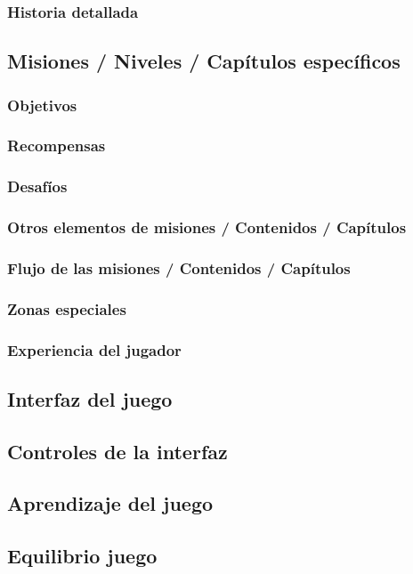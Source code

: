 \subsubsection{Historia detallada}
\subsection{Misiones / Niveles / Capítulos específicos}
\subsubsection{Objetivos}
\subsubsection{Recompensas}
\subsubsection{Desafíos}
\subsubsection{Otros elementos de misiones / Contenidos / Capítulos}
\subsubsection{Flujo de las misiones / Contenidos / Capítulos}
\subsubsection{Zonas especiales}
\subsubsection{Experiencia del jugador}
\subsection{Interfaz del juego}
\subsection{Controles de la interfaz}
\subsection{Aprendizaje del juego}
\subsection{Equilibrio juego}



